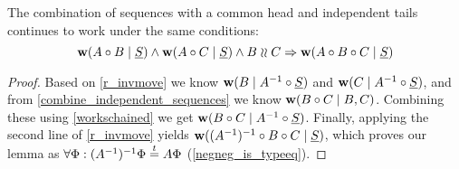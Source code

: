 \begin{mylem}\label{indep_prefix_combine}
The combination of sequences with a common head and independent tails 
continues to work under the same conditions:
\[ \mathbf{w}({A\circ B}\mathrel{|}{\underline{S}}) \wedge \mathbf{w}({A\circ C}\mathrel{|}{\underline{S}}) \wedge B\mathrel{\wr\wr} C \Rightarrow \mathbf{w}({A\circ B\circ C}\mathrel{|}{\underline{S}}) \]
\end{mylem}
\begin{proof}
Based on \cref{r_invmove} we know
$\mathbf{w}({B}\mathrel{|}{A^{-1}\circ \underline{S}})$ and $\mathbf{w}({C}\mathrel{|}{A^{-1}\circ \underline{S}})$,
and from \cref{combine_independent_sequences} we know
$\mathbf{w}({B\circ C}\mathrel{|}{B,C})$.
Combining these using \cref{workschained}
we get
$\mathbf{w}({B\circ C}\mathrel{|}{A^{-1}\circ \underline{S}})$. 
Finally, applying the second line of \cref{r_invmove} yields
$\mathbf{w}({(A^{-1})^{-1}\circ B\circ C}\mathrel{|}{\underline{S}})$, which proves our lemma 
as $\forall\Phi: (A^{-1})^{-1}\Phi\stackrel{t}{=} A\Phi$ (\cref{negneg_is_typeeq}).
\end{proof}
